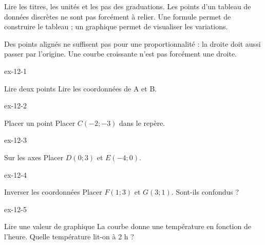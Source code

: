 \begin{savoirfaire}Lire les titres, les unités et les pas des graduations. Les points d’un tableau de données discrètes ne sont pas forcément à relier. Une formule permet de construire le tableau ; un graphique permet de visualiser les variations.\end{savoirfaire}
\begin{attention}Des points alignés ne suffisent pas pour une proportionnalité : la droite doit aussi passer par l’origine. Une courbe croissante n’est pas forcément une droite.\end{attention}

\clearpage{}
\begin{blocLivre}{ex-12-1}\begin{exercice}[1]{Lire deux points}
Lire les coordonnées de A et B.
\label{fig-ex-12-1}
\end{exercice}\end{blocLivre}
\begin{blocLivre}{ex-12-2}\begin{exercice}[1]{Placer un point}
Placer $C(-2;-3)$ dans le repère.
\label{fig-ex-12-2}
\end{exercice}\end{blocLivre}
\begin{blocLivre}{ex-12-3}\begin{exercice}[1]{Sur les axes}
Placer $D(0;3)$ et $E(-4;0)$.
\label{fig-ex-12-3}
\end{exercice}\end{blocLivre}
\begin{blocLivre}{ex-12-4}\begin{exercice}[1]{Inverser les coordonnées}
Placer $F(1;3)$ et $G(3;1)$. Sont-ils confondus ?
\label{fig-ex-12-4}
\end{exercice}\end{blocLivre}
\begin{blocLivre}{ex-12-5}\begin{exercice}[1]{Lire une valeur de graphique}
La courbe donne une température en fonction de l’heure. Quelle température lit-on à 2 h ?
\label{fig-ex-12-5}
\end{exercice}\end{blocLivre}

